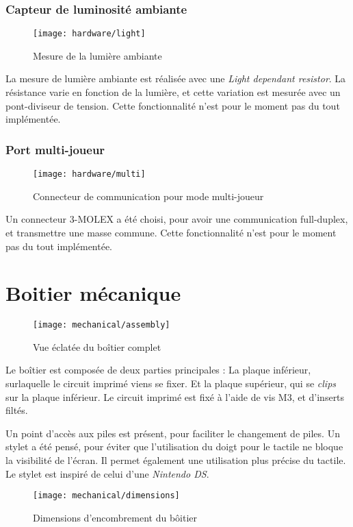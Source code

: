 \subsubsection{Capteur de luminosité ambiante}
\begin{figure}[H]
  \centering
  \texttt{[image: hardware/light]}
  \caption{Mesure de la lumière ambiante}
  \label{hard_light}
\end{figure}
La mesure de lumière ambiante est réalisée avec une \emph{Light dependant
resistor}. La résistance varie en fonction de la lumière, et cette variation
est mesurée avec un pont-diviseur de tension.
Cette fonctionnalité n'est pour le moment pas du tout implémentée.

\subsubsection{Port multi-joueur}
\begin{figure}[H]
  \centering
  \texttt{[image: hardware/multi]}
  \caption{Connecteur de communication pour mode multi-joueur}
  \label{hard_multi}
\end{figure}
Un connecteur 3-MOLEX a été choisi, pour avoir une communication full-duplex,
et transmettre une masse commune.
Cette fonctionnalité n'est pour le moment pas du tout implémentée.
\newpage

\section{Boitier mécanique}
\begin{figure}[H]
  \centering
  \texttt{[image: mechanical/assembly]}
  \caption{Vue éclatée du boîtier complet}
  \label{mech_assembly}
\end{figure}
Le boîtier est composée de deux parties principales : La plaque inférieur,
surlaquelle le circuit imprimé viens se fixer. Et la plaque supérieur, qui
se \emph{clips} sur la plaque inférieur.
Le circuit imprimé est fixé à l'aide de vis M3, et d'inserts filtés.

Un point d'accès aux piles est présent, pour faciliter le changement de piles.
Un stylet a été pensé, pour éviter que l'utilisation du doigt pour le tactile
ne bloque la visibilité de l'écran. Il permet également une utilisation plus
précise du tactile. Le stylet est inspiré de celui d'une \emph{Nintendo DS}.
\begin{figure}[H]
  \centering
  \texttt{[image: mechanical/dimensions]}
  \caption{Dimensions d'encombrement du bôitier}
  \label{mech_dimensions}
\end{figure}
\newpage

